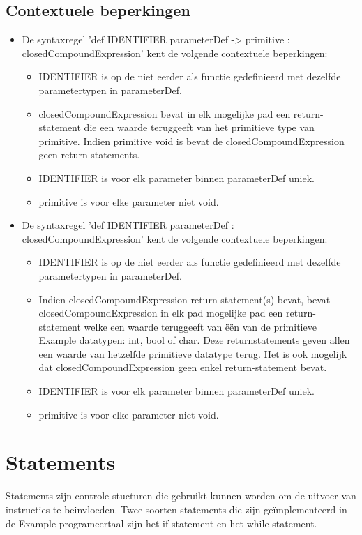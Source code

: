     \subsection{Contextuele beperkingen}
        \begin{itemize}
        \item De syntaxregel 'def IDENTIFIER parameterDef -> primitive $\colon$ closedCompoundExpression' kent de volgende contextuele beperkingen:
            \begin{itemize}
                \item IDENTIFIER is op de niet eerder als functie gedefinieerd met dezelfde parametertypen in parameterDef.
                \item closedCompoundExpression bevat in elk mogelijke pad een return-statement die een waarde teruggeeft van het primitieve type van primitive. Indien primitive void is bevat de closedCompoundExpression geen return-statements.
                \item IDENTIFIER is voor elk parameter binnen parameterDef uniek.
                \item primitive is voor elke parameter niet void.
            \end{itemize}
        \item De syntaxregel 'def IDENTIFIER parameterDef $\colon$ closedCompoundExpression' kent de volgende contextuele beperkingen:
            \begin{itemize}
                \item IDENTIFIER is op de niet eerder als functie gedefinieerd met dezelfde parametertypen in parameterDef.
                \item Indien closedCompoundExpression return-statement(s) bevat, bevat closedCompoundExpression in elk pad mogelijke pad een return-statement welke een waarde teruggeeft van \"{e}\"{e}n van de primitieve Example datatypen: int, bool of char. Deze returnstatements geven allen een waarde van hetzelfde primitieve datatype terug. Het is ook mogelijk dat closedCompoundExpression geen enkel return-statement bevat.
                \item IDENTIFIER is voor elk parameter binnen parameterDef uniek.
                \item primitive is voor elke parameter niet void.
            \end{itemize}
        \end{itemize}

\section{Statements}
Statements zijn controle stucturen die gebruikt kunnen worden om de uitvoer van instructies te beinvloeden. Twee soorten statements die zijn ge\"{i}mplementeerd in de Example programeertaal zijn het if-statement en het while-statement.
